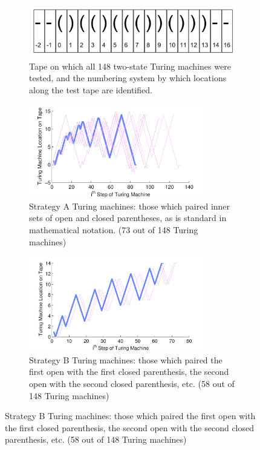 \begin{figure}[p]

\begin{subfigure}[b]{1.0\textwidth}
\centering
\includegraphics[width=140mm]{Body/figures/ICERtapeLocations.png}
\caption{Tape on which all 148 two-state Turing machines were tested, and the numbering system by which locations along the test tape are identified.}
\label{tapeLocations}
\end{subfigure}

\begin{subfigure}[b]{1.0\textwidth}
\centering
\includegraphics[width=0.85\textwidth]{Body/figures/tmvisualization_InnerParensMatched_allkidsAnno2}
\caption{Strategy A Turing machines: those which paired inner sets of open and closed parentheses, as is standard in mathematical notation. (73 out of 148 Turing machines)}
\label{tapeMoveA}
\end{subfigure}

\begin{subfigure}[b]{1.0\textwidth}
\centering
\includegraphics[width=0.85\textwidth]{Body/figures/tmvisualization_NtoNParensMatched_allkidsAnno2}
\caption{Strategy B Turing machines: those which paired the first open with the first closed parenthesis, the second open with the second closed parenthesis, etc. (58 out of 148 Turing machines)}
\label{tapeMoveB}
\end{subfigure}


\end{figure}
